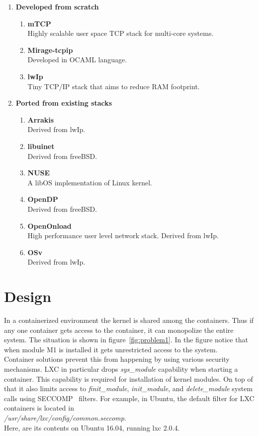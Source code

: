 \documentclass[twoside]{iitbreport}
\begin{document}
\begin{enumerate}
\item \textbf{Developed from scratch}\\
\begin{enumerate}
\item \textbf{mTCP}\cite{mTCP}\\
Highly scalable user space TCP stack for multi-core systems.
\item \textbf{Mirage-tcpip}\cite{mirage-tcpip}\\
Developed in OCAML language.
\item \textbf{lwIp}\cite{lwip}\\
Tiny TCP/IP stack that aims to reduce RAM footprint. 
\end{enumerate}
\item \textbf{Ported from existing stacks}\\
\begin{enumerate}
\item \textbf{Arrakis}\cite{arrakis}\\
Derived from lwIp.
\item \textbf{libuinet}\cite{libuinet}\\
Derived from freeBSD.
\item \textbf{NUSE}\cite{nuse}\\
A libOS implementation of Linux kernel.
\item \textbf{OpenDP}\cite{OpenDP}\\
Derived from freeBSD.
\item \textbf{OpenOnload}\cite{OpenOnload}\\
High performance user level network stack. Derived from lwIp.
\item \textbf{OSv}\cite{osv}\\
Derived from lwIp.
\end{enumerate}
\end{enumerate}

\chapter{Design}
In a containerized environment the kernel is shared among the containers. Thus if any one container gets access to the container, it can monopolize the entire system. The situation is shown in figure~\ref{fig:problem1}. In the figure notice that when module M1 is installed it gets unrestricted access to the system. \\
Container solutions prevent this from happening by using various security mechanisms. 
LXC in particular drops \textit{ sys\_module} capability\cite{capabilityInLinux26} when starting a container. This capability is required for installation of kernel modules. On top of that it also limits access to \textit{finit\_module},  \textit{init\_module}, and \textit{delete\_module} system calls using SECCOMP~\cite{seccomp12} filters. For example, in Ubuntu, the default filter for LXC containers is located in\\ \textit{/usr/share/lxc/config/common.seccomp}. \\
Here, are its contents on Ubuntu 16.04, running lxc 2.0.4.\\
\end{document}
